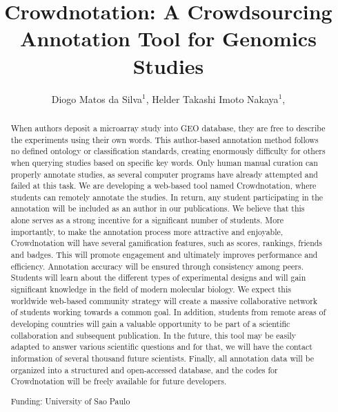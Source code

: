 \documentclass[twoside]{article}
\title{\vspace{-15mm}\fontsize{24pt}{10pt}\selectfont\textbf{ Crowdnotation: A Crowdsourcing Annotation Tool for Genomics Studies }} %
\author{ Diogo Matos da Silva$^{1}$, Helder Takashi Imoto Nakaya$^{1}$, }
\affil{ 1 University of Sao Paulo

 }
\date{}
\begin{document}
  
  
  \maketitle %
  
  
  \thispagestyle{fancy} %
  
  
  \begin{abstract}
  When authors deposit a microarray study into GEO database, they are free to describe the experiments using their own words. This author-based annotation method follows no defined ontology or classification standards, creating enormously difficulty for others when querying studies based on specific key words. Only human manual curation can properly annotate studies, as several computer programs have already attempted and failed at this task. 
We are developing a web-based tool named Crowdnotation, where students can remotely annotate the studies. In return, any student participating in the annotation will be included as an author in our publications. We believe that this alone serves as a strong incentive for a significant number of students. More importantly, to make the annotation process more attractive and enjoyable, Crowdnotation will have several gamification features, such as scores, rankings, friends and badges. This will promote engagement and ultimately improves performance and efficiency. 
Annotation accuracy will be ensured through consistency among peers. Students will learn about the different types of experimental designs and will gain significant knowledge in the field of modern molecular biology.
We expect this worldwide web-based community strategy will create a massive collaborative network of students working towards a common goal. In addition, students from remote areas of developing countries will gain a valuable opportunity to be part of a scientific collaboration and subsequent publication. In the future, this tool may be easily adapted to answer various scientific questions and for that, we will have the contact information of several thousand future scientists. Finally, all annotation data will be organized into a structured and open-accessed database, and the codes for Crowdnotation will be freely available for future developers.
  
  Funding: University of Sao Paulo \\ 
  \end{abstract}
  
\end{document}

